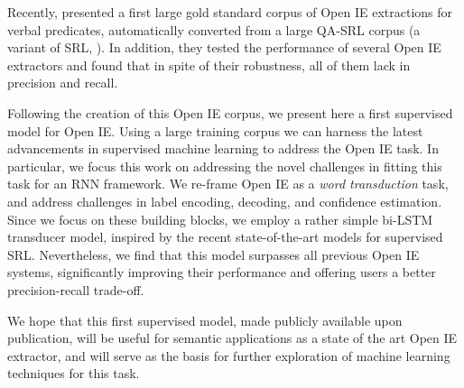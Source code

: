Recently, \citet{Stanovsky2016EMNLP} %
presented a first large gold standard corpus of Open IE extractions for verbal predicates, automatically converted from a large QA-SRL corpus (a variant of SRL, \cite{hequestion}).
In addition, they tested the performance of several Open IE extractors and found that
in spite of their robustness,
all of them lack in precision and recall.

Following the creation of this Open IE corpus,
we present here a first supervised model for Open IE.
Using a large training corpus we can harness the latest advancements in supervised machine learning to address the Open IE task.
In particular, we focus this work on addressing
the novel challenges in fitting this task for an RNN framework.
We re-frame Open IE as a \emph{word transduction} task, and address challenges in label encoding, decoding,
and confidence estimation.
Since we focus on these building blocks, we employ a rather simple bi-LSTM transducer model,
inspired by the recent state-of-the-art models for supervised SRL.
Nevertheless, we find that this model surpasses all previous Open IE systems, significantly improving their performance and
offering users a better precision-recall trade-off.

We hope that this first supervised model, made publicly available upon publication,  will be useful for semantic applications as a state of the art Open IE extractor, and will serve as the basis for further exploration of machine learning techniques for this task.


